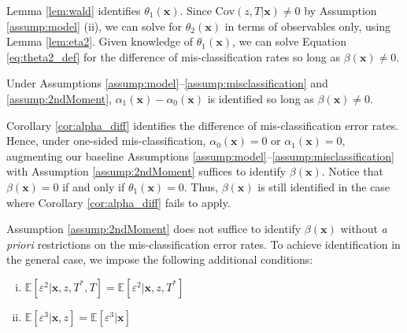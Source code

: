 Lemma \ref{lem:wald} identifies $\theta_1(\mathbf{x})$.
Since $\mbox{Cov}(z,T|\mathbf{x}) \neq 0$ by Assumption \ref{assump:model} (ii), we can solve for $\theta_2(\mathbf{x})$ in terms of observables only, using Lemma \ref{lem:eta2}.
Given knowledge of $\theta_1(\mathbf{x})$, we can solve Equation \ref{eq:theta2_def} for the difference of mis-classification rates so long as $\beta(\mathbf{x}) \neq 0$.

\begin{cor}
  Under Assumptions \ref{assump:model}--\ref{assump:misclassification} and \ref{assump:2ndMoment}, $\alpha_1(\mathbf{x}) - \alpha_0(\mathbf{x})$ is identified so long as $\beta(\mathbf{x}) \neq 0$.
  \label{cor:alpha_diff}
\end{cor}
Corollary \ref{cor:alpha_diff} identifies the difference of mis-classification error rates.
Hence, under one-sided mis-classification, $\alpha_0(\mathbf{x}) = 0$ or $\alpha_1(\mathbf{x}) = 0$, augmenting our baseline Assumptions \ref{assump:model}--\ref{assump:misclassification} with Assumption \ref{assump:2ndMoment} suffices to identify $\beta(\mathbf{x})$.
Notice that $\beta(\mathbf{x})=0$ if and only if $\theta_1(\mathbf{x}) = 0$.
Thus, $\beta(\mathbf{x})$ is still identified in the case where Corollary \ref{cor:alpha_diff} fails to apply.

Assumption \ref{assump:2ndMoment} does not suffice to identify $\beta(\mathbf{x})$ without \emph{a priori} restrictions on the mis-classification error rates.
To achieve identification in the general case, we impose the following additional conditions:
\begin{assump} \mbox{}
  \label{assump:3rdMoment}
  \begin{enumerate}[(i)] 
    \item $\mathbb{E}[\varepsilon^2|\mathbf{x},z,T^*,T] = \mathbb{E}[\varepsilon^2|\mathbf{x},z, T^*]$
    \item $\mathbb{E}[\varepsilon^3|\mathbf{x},z] = \mathbb{E}[\varepsilon^3|\mathbf{x}]$
  \end{enumerate}
\end{assump}

